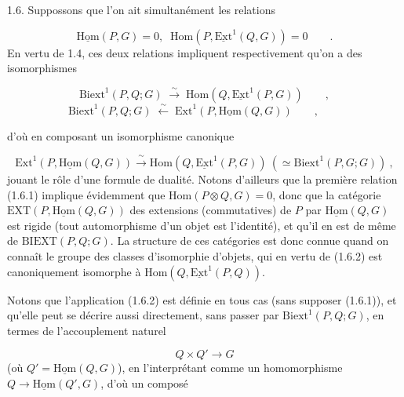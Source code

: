 1.6.  Suppossons que l'on ait simultanément les relations

\begin{equation}\tag{1.6.1}
\underline{\mathrm{Hom}}(P,G) = 0, \;\; \mathrm{Hom}(P,\underline{\mathrm{Ext}}^1(Q,G)) = 0 \qquad .
\end{equation}
En vertu de 1.4, ces deux relations impliquent respectivement qu'on a des isomorphismes

\begin{equation*}
\mathrm{Biext}^1(P,Q;G) \;\stackrel{\sim}{\longrightarrow}\; \mathrm{Hom}(Q,\underline{\mathrm{Ext}}^1(P,G)) \qquad ,
\end{equation*}
\begin{equation*}
\mathrm{Biext}^1(P,Q;G) \;\stackrel{\sim}{\longleftarrow}\; \mathrm{Ext}^1(P,\underline{\mathrm{Hom}}(Q,G)) \qquad , \qquad 
\end{equation*}


 d'où en composant un isomorphisme canonique

\begin{equation}\tag{1.6.2}
\mathrm{Ext}^1(P,\underline{\mathrm{Hom}}(Q,G)) \xrightarrow{\ \sim\ } \mathrm{Hom}(Q,\underline{\mathrm{Ext}}^1(P,G)) \ ( \simeq \mathrm{Biext}^1(P,G;G)) \ ,
\end{equation}
jouant le rôle d'une formule de dualité. Notons d'ailleurs que la première relation (1.6.1) implique évidemment que $\mathrm{Hom}(P \otimes Q,G) = 0$, donc que la catégorie $\mathrm{EXT}(P,\underline{\mathrm{Hom}}(Q,G))$ des extensions (commutatives) de $P$ par $\underline{\mathrm{Hom}}(Q,G)$ est rigide (tout automorphisme d'un objet est l'identité), et qu'il en est de même de $\mathrm{BIEXT}(P,Q;G)$. La structure de ces catégories est donc connue quand on connaît le groupe des classes d'isomorphie d'objets, qui en vertu de (1.6.2) est canoniquement isomorphe à $\mathrm{Hom}(Q,\underline{\mathrm{Ext}}^1(P,Q))$.

Notons que l'application (1.6.2) est définie en tous cas (sans supposer (1.6.1)), et qu'elle peut se décrire aussi directement, sans passer par $\mathrm{Biext}^1(P,Q;G)$, en termes de l'accouplement naturel

\begin{equation*}
Q \times Q' \longrightarrow G
\end{equation*}
(où $Q' = \underline{\mathrm{Hom}}(Q,G)$), en l'interprétant comme un homomorphisme $Q \to \underline{\mathrm{Hom}}(Q',G)$, d'où un composé

